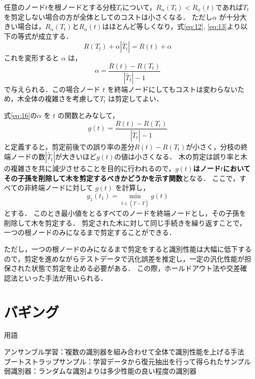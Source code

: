 \documentclass[dvipdfmx]{jreport}
\begin{document}
任意のノード$t$を根ノードとする分枝$T_t$について，$R_\alpha(T_t) < R_\alpha(t)$であれば$T_t$を剪定しない場合の方が全体としてのコストは小さくなる．
ただし$\alpha$ が十分大きい場合は，$R_\alpha(T_t)$と$R_\alpha(t)$はほとんど等しくなり，式\eqref{eq:12}, \eqref{eq:13}より以下の等式が成立する．
\begin{equation}
    R(T_t) + \alpha|\tilde{T_t}| = R(t) + \alpha \label{eq:25}
\end{equation}
これを変形すると $\alpha$ は，
\begin{equation}
    \alpha = \frac{R(t) - R(T_t)}{|\tilde{T_t}| - 1} \label{eq:16}
\end{equation}
で与えられる．この場合ノード $t$ を終端ノードにしてもコストは変わらないため，木全体の複雑さを考慮して$T_t$ は剪定してよい．

式\eqref{eq:16}の$\alpha$ を $t$ の関数とみなして，
\begin{equation}
    g(t) = \frac{R(t) - R(T_t)}{|\tilde{T_t}| - 1} \label{eq:17}
\end{equation}
と定義すると，剪定前後での誤り率の差分$R(t) - R(T_t)$が小さく，分枝の終端ノードの数$|\tilde{T_t}|$が大きいほど$g(t)$の値は小さくなる．
木の剪定は誤り率と木の複雑さを共に減少させることを目的に行われるので，\textbf{$g(t)$はノード$t$においてその子孫を削除して木を剪定するべきかどうかを示す関数}となる．
ここで，すべての非終端ノードに対して $g(t)$ を計算し，
\begin{equation}
    g_1(t_1) = \min_{t \in (T-\tilde{T})} g(t) \label{eq:18}
\end{equation}
とする．
このとき最小値をとるすべてのノードを終端ノードとし，その子孫を削除して木を剪定する．
剪定された木に対して同じ手続きを繰り返すことで，一つの根ノードのみになるまで剪定することができる．

ただし，一つの根ノードのみになるまで剪定をすると識別性能は大幅に低下するので，剪定を進めながらテストデータで汎化誤差を推定し，一定の汎化性能が担保された状態で剪定を止める必要がある．
この際，ホールドアウト法や交差確認法といった手法が用いられる．


\section{バギング}

\begin{itembox}[l]{\large{用語}}
    \begin{tabbing}
        \hspace{15pt} \raisebox{0.5ex}{\tiny $\bullet$} アンサンブル学習\hspace{43pt}\=：複数の識別器を組み合わせて全体で識別性能を上げる手法\\[0.5em]
        \hspace{15pt} \raisebox{0.5ex}{\tiny $\bullet$} ブートストラップサンプル\>：学習データから復元抽出を行って得られたサンプル\\[0.5em]
        \hspace{15pt} \raisebox{0.5ex}{\tiny $\bullet$} 弱識別器\>：ランダムな識別よりは多少性能の良い程度の識別器
    \end{tabbing}
\end{itembox}
\end{document}
